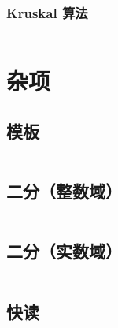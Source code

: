 \documentclass[a4paper, twoside]{article}
\begin{document}
    \subsubsection{Kruskal 算法}
    \inputminted{cpp}{../src/图论/Kruskal.cpp}







\newpage
\section{杂项}
\subsection{模板}
\inputminted{cpp}{../src/杂项/模板.cpp}

\subsection{二分（整数域）}
\inputminted{cpp}{../src/杂项/二分（整数域）.cpp}

\subsection{二分（实数域）}
\inputminted{cpp}{../src/杂项/二分（实数域）.cpp}

\subsection{快读}
\inputminted{cpp}{../src/杂项/快读.cpp}
\end{document}
